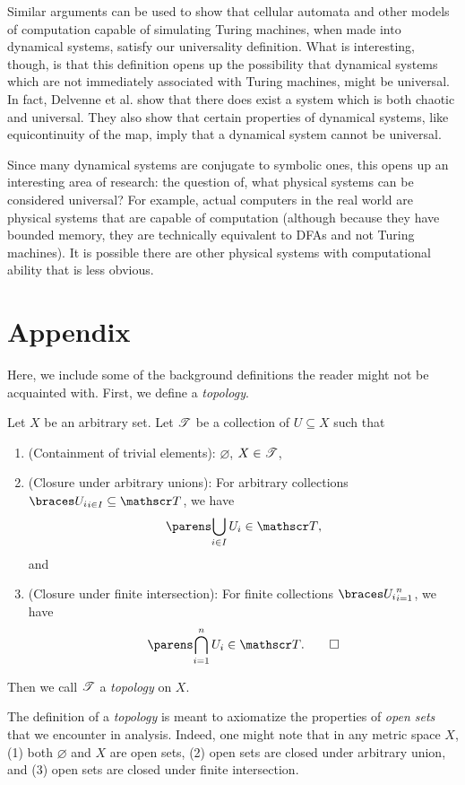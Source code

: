 \documentclass{fkpaper}
\begin{document}
\begin{multicols}{2}
  Similar arguments can be used to show that cellular automata and other models of computation capable of simulating Turing machines, when made into dynamical systems, satisfy our universality definition. What is interesting, though, is that this definition opens up the possibility that dynamical systems which are not immediately associated with Turing machines, might be universal. In fact, Delvenne et al. show that there does exist a system which is both chaotic and universal. They also show that certain properties of dynamical systems, like equicontinuity of the map, imply that a dynamical system cannot be universal.

  Since many dynamical systems are conjugate to symbolic ones, this opens up an interesting area of research: the question of, what physical systems can be considered universal? For example, actual computers in the real world are physical systems that are capable of computation (although because they have bounded memory, they are technically equivalent to DFAs and not Turing machines). It is possible there are other physical systems with computational ability that is less obvious.





  \section{Appendix}
  Here, we include some of the background definitions the reader might
  not be acquainted with. First, we define a \emph{topology}.
  \begin{definition}[Topology]
    Let $X$ be an arbitrary set. Let ${\mathscr{T}}$ be a collection of $U
    \subseteq X$ such that
    \begin{enumerate}
      \item (Containment of trivial elements): $\varnothing$, $X \in {\mathscr{T}}$,
      \item (Closure under arbitrary unions): For arbitrary collections
        $\set{U_i}_{i \in I} \subseteq \ms T$, we have
        \[
        \pn{\bigcup_{i \in I} U_i } \in \ms T,
        \]
        and
      \item (Closure under finite intersection): For finite collections
        $\set{U_i}_{i = 1}^n$, we have
        \[
        \pn{\bigcap_{i=1}^n U_i} \in \ms T. \qedhere
        \]
    \end{enumerate}
    Then we call ${\mathscr{T}}$ a \emph{topology} on $X$.
  \end{definition}
  The definition of a \emph{topology} is meant to axiomatize the
  properties of \emph{open sets} that we encounter in analysis. Indeed,
  one might note that in any metric space $X$, (1) both $\varnothing$
  and $X$ are open sets, (2) open sets are closed under arbitrary union,
  and (3) open sets are closed under finite intersection.


\end{multicols}
\end{document}
